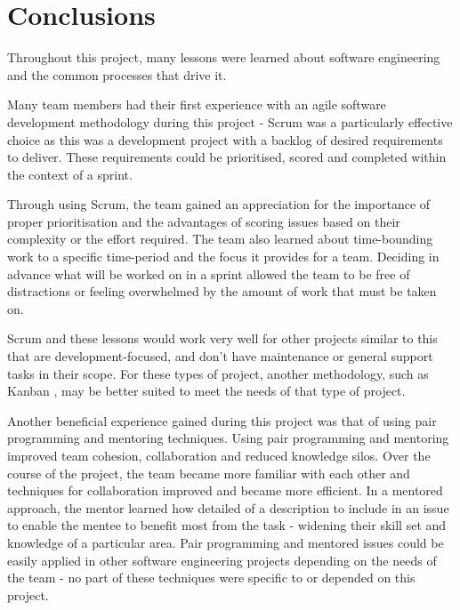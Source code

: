 \documentclass{l3proj}
\begin{document}
\section{Conclusions}
\label{sec:conclusions}

Throughout this project, many lessons were learned about software engineering and the common processes that drive it.

Many team members had their first experience with an agile software development methodology during this project - Scrum was a particularly effective choice as this was a development project with a backlog of desired requirements to deliver. These requirements could be prioritised, scored and completed within the context of a sprint.

Through using Scrum, the team gained an appreciation for the importance of proper prioritisation and the advantages of scoring issues based on their complexity or the effort required. The team also learned about time-bounding work to a specific time-period and the focus it provides for a team. Deciding in advance what will be worked on in a sprint allowed the team to be free of distractions or feeling overwhelmed by the amount of work that must be taken on.

Scrum and these lessons would work very well for other projects similar to this that are development-focused, and don't have maintenance or general support tasks in their scope. For these types of project, another methodology, such as Kanban \cite{kanban}, may be better suited to meet the needs of that type of project.

Another beneficial experience gained during this project was that of using pair programming and mentoring techniques. Using pair programming and mentoring improved team cohesion, collaboration and reduced knowledge silos. Over the course of the project, the team became more familiar with each other and techniques for collaboration improved and became more efficient. In a mentored approach, the mentor learned how detailed of a description to include in an issue to enable the mentee to benefit most from the task - widening their skill set and knowledge of a particular area. Pair programming and mentored issues could be easily applied in other software engineering projects depending on the needs of the team - no part of these techniques were specific to or depended on this project.
\end{document}
